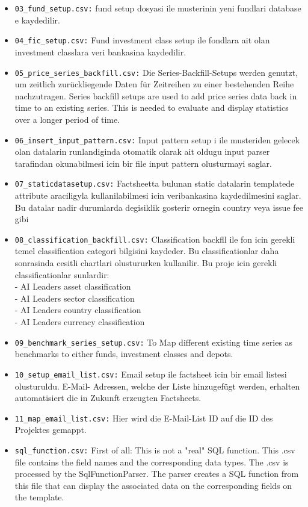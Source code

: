\begin{itemize}
    \item \texttt{03\_fund\_setup.csv:} fund setup dosyasi ile musterinin yeni fundlari database e kaydedilir.
    \item \texttt{04\_fic\_setup.csv:} Fund investment class setup ile fondlara ait olan investment classlara veri bankasina kaydedilir.
    \item \texttt{05\_price\_series\_backfill.csv:} Die Series-Backfill-Setups werden genutzt, um zeitlich zurückliegende Daten für Zeitreihen zu einer bestehenden Reihe nachzutragen. Series backfill setups are used to add price series data back in time to an existing series. This is needed to evaluate and display statistics over a longer period of time. 
    \item \texttt{06\_insert\_input\_pattern.csv:} Input pattern setup i ile musteriden gelecek olan datalarin runlandiginda otomatik olarak ait oldugu input parser tarafindan okunabilmesi icin bir file input pattern olusturmayi saglar.
    \item \texttt{07\_staticdatasetup.csv:} Factsheetta bulunan static datalarin templatede attribute araciligyla kullanilabilmesi icin veribankasina kaydedilmesini saglar. Bu datalar nadir durumlarda degisiklik gosterir ornegin country veya issue fee gibi
    \item \texttt{08\_classification\_backfill.csv:} Classification backfll ile fon icin gerekli temel classification categori bilgisini kaydeder. Bu classificationlar daha sonrasinda cesitli chartlari olustururken kullanilir. Bu proje icin gerekli classificationlar sunlardir:\\
    - AI Leaders asset classification \\
    - AI Leaders sector classification \\
    - AI Leaders country classification \\
    - AI Leaders currency classification
    \item \texttt{09\_benchmark\_series\_setup.csv:} To Map different existing time series as benchmarks to either funds, investment classes and depots. 
    \item \texttt{10\_setup\_email\_list.csv:} Email setup ile factsheet icin bir email listesi olusturuldu. E-Mail- Adressen, welche der Liste hinzugefügt werden, erhalten automatisiert die in Zukunft erzeugten Factsheets.
    \item \texttt{11\_map\_email\_list.csv:} Hier wird die E-Mail-List ID auf die ID des Projektes gemappt.
    \item \texttt{sql\_function.csv:} First of all: This is not a "real" SQL function. This .csv file contains the field names and the corresponding data types. The .csv is processed by the SqlFunctionParser. The parser creates a SQL function from this file that can display the associated data on the corresponding fields on the template.
\end{itemize}


